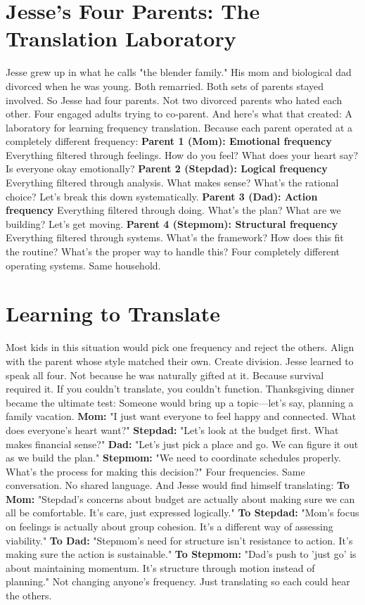 \documentclass[12pt,openany]{book}
\begin{document}
\section{Jesse's Four Parents: The Translation Laboratory}

Jesse grew up in what he calls "the blender family."
His mom and biological dad divorced when he was young. Both remarried. Both sets of parents stayed involved.
So Jesse had four parents. Not two divorced parents who hated each other. Four engaged adults trying to co-parent.
And here's what that created: A laboratory for learning frequency translation.
Because each parent operated at a completely different frequency:
\textbf{Parent 1 (Mom): Emotional frequency}
Everything filtered through feelings. How do you feel? What does your heart say? Is everyone okay emotionally?
\textbf{Parent 2 (Stepdad): Logical frequency}
Everything filtered through analysis. What makes sense? What's the rational choice? Let's break this down systematically.
\textbf{Parent 3 (Dad): Action frequency}
Everything filtered through doing. What's the plan? What are we building? Let's get moving.
\textbf{Parent 4 (Stepmom): Structural frequency}
Everything filtered through systems. What's the framework? How does this fit the routine? What's the proper way to handle this?
Four completely different operating systems. Same household.

\section{Learning to Translate}

Most kids in this situation would pick one frequency and reject the others. Align with the parent whose style matched their own. Create division.
Jesse learned to speak all four.
Not because he was naturally gifted at it. Because survival required it. If you couldn't translate, you couldn't function.
Thanksgiving dinner became the ultimate test:
Someone would bring up a topic—let's say, planning a family vacation.
\textbf{Mom:} "I just want everyone to feel happy and connected. What does everyone's heart want?"
\textbf{Stepdad:} "Let's look at the budget first. What makes financial sense?"
\textbf{Dad:} "Let's just pick a place and go. We can figure it out as we build the plan."
\textbf{Stepmom:} "We need to coordinate schedules properly. What's the process for making this decision?"
Four frequencies. Same conversation. No shared language.
And Jesse would find himself translating:
\textbf{To Mom:} "Stepdad's concerns about budget are actually about making sure we can all be comfortable. It's care, just expressed logically."
\textbf{To Stepdad:} "Mom's focus on feelings is actually about group cohesion. It's a different way of assessing viability."
\textbf{To Dad:} "Stepmom's need for structure isn't resistance to action. It's making sure the action is sustainable."
\textbf{To Stepmom:} "Dad's push to 'just go' is about maintaining momentum. It's structure through motion instead of planning."
Not changing anyone's frequency. Just translating so each could hear the others.
\end{document}
